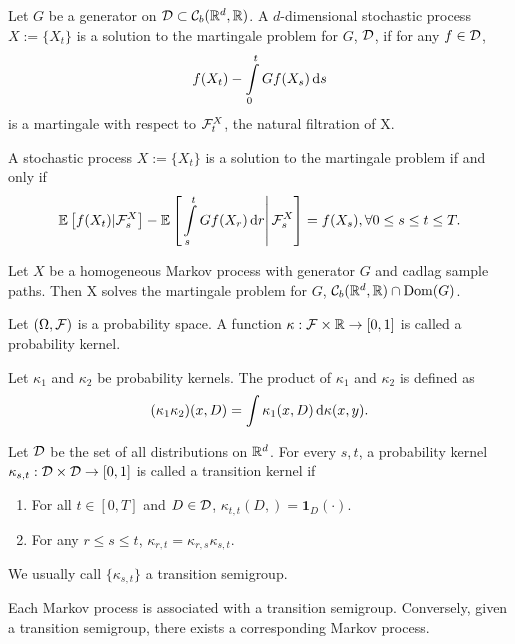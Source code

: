 \begin{definition}
 Let $G$ be a generator on $\mathcal{D}\subset\mathcal{C}_b(\mathbb{R}^d, \mathbb{R})$. A $d$-dimensional stochastic process $X:=\{X_t\}$ is a solution to the martingale problem for $G$, $\mathcal{D}$, if for any $f\in \mathcal{D}$,
 \begin{equation}
  f(X_t) - \int\limits_0^t Gf(X_s)\,\mathrm{d} s
 \end{equation}
 is a martingale with respect to ${\mathcal{F}^X_t}$, the natural filtration of X.
\end{definition}

\begin{lemma}
 A stochastic process $X:=\{X_t\}$ is a solution to the martingale problem if and only if
 \begin{equation}
  \mathbb{E}\left[f(X_t)|\mathcal{F}^X_s\right] - \mathbb{E}\left[\left.\int\limits_{s}^t Gf(X_r)\,\mathrm{d} r \right| \mathcal{F}^X_s\right] = f(X_s), \forall 0\le s\le t\le T.
 \end{equation}
\end{lemma}


\begin{theorem}
 Let $X$ be a homogeneous Markov process with generator $G$ and cadlag sample paths. Then X solves the martingale problem for $G$, $\mathcal{C}_b(\mathbb{R}^d, \mathbb{R})\cap \mathrm{Dom}(G)$.
\end{theorem}

\begin{definition}
 Let $(\Omega, \mathcal{F})$ is a probability space. A function $\kappa: \mathcal{F} \times \mathbb{R} \to [0,1]$ is called a probability kernel.
\end{definition}

\begin{definition}
 Let $\kappa_1$ and $\kappa_2$ be probability kernels. The product of $\kappa_1$ and $\kappa_2$ is defined as
 \begin{equation}
  (\kappa_1\kappa_2)(x, D) = \int\kappa_1(x, D)\,\mathrm{d}\kappa(x, y).
 \end{equation}
\end{definition}

\begin{definition}
 Let $\mathcal{D}$ be the set of all distributions on $\mathbb{R}^d$. For every $s,t$, a probability kernel $\kappa_{s,t} : \mathcal{D} \times \mathcal{D} \to [0,1]$ is called a transition kernel if
 \begin{enumerate}[label = (\roman*)]
  \item For all $t\in[0,T]$ and $D\in\mathcal{D}$, $\kappa_{t,t}(D, ) = \mathbf{1}_{D}(\cdot)$.
  \item For any $r\le s\le t$, $\kappa_{r,t}=  \kappa_{r,s}\kappa_{s,t}$.
 \end{enumerate}
 We usually call $\{\kappa_{s,t}\}$ a transition semigroup.
\end{definition}

Each Markov process is associated with a transition semigroup. Conversely, given a transition semigroup, there exists a corresponding Markov process.

